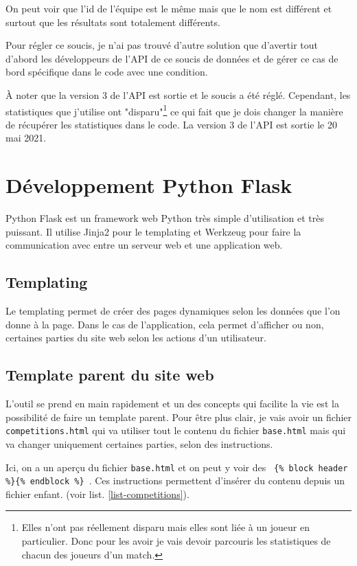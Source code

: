 \documentclass[a4paper,14pt]{extarticle}
\begin{document}
{On peut voir que l'id de l'équipe est le même mais que le nom est différent et surtout que les résultats sont totalement différents.

Pour régler ce soucis, je n'ai pas trouvé d'autre solution que d'avertir tout d'abord les développeurs de l'API de ce soucis de données et de gérer ce cas de bord spécifique dans le code avec une condition.

À noter que la version 3 de l'API est sortie et le soucis a été réglé. Cependant, les statistiques que j'utilise ont "disparu"\footnote{Elles n'ont pas réellement disparu mais elles sont liée à un joueur en particulier. Donc pour les avoir je vais devoir parcouris les statistiques de chacun des joueurs d'un match.} ce qui fait que je dois changer la manière de récupérer les statistiques dans le code. La version 3 de l'API est sortie le 20 mai 2021. 

\section{Développement Python Flask}

Python Flask est un framework web Python très simple d'utilisation et très puissant. Il utilise Jinja2 pour le templating et Werkzeug pour faire la communication avec entre un serveur web et une application web. 

\subsection{Templating}

Le templating permet de créer des pages dynamiques selon les données que l'on donne à la page. Dans le cas de l'application, cela permet d'afficher ou non, certaines parties du site web selon les actions d'un utilisateur.

\subsection{Template parent du site web}

L'outil se prend en main rapidement et un des concepts qui facilite la vie est la possibilité de faire un template parent. Pour être plus clair, je vais avoir un fichier \texttt{competitions.html} qui va utiliser tout le contenu du fichier \texttt{base.html} mais qui va changer uniquement certaines parties, selon des instructions.

Ici, on a un aperçu du fichier \texttt{base.html} et on peut y voir des \texttt{ \{\% block header \%\}\{\% endblock \%\} }. Ces instructions permettent d'insérer du contenu depuis un fichier enfant. (voir list.  \ref{list-competitions}).

}
\end{document}
